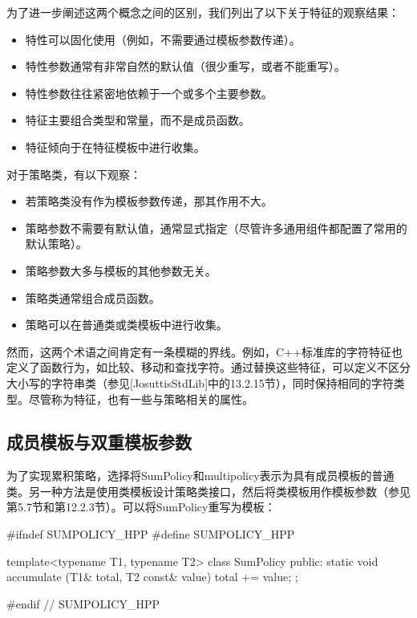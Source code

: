 为了进一步阐述这两个概念之间的区别，我们列出了以下关于特征的观察结果：

\begin{itemize}
\item 
特性可以固化使用（例如，不需要通过模板参数传递）。

\item 
特性参数通常有非常自然的默认值（很少重写，或者不能重写）。

\item 
特性参数往往紧密地依赖于一个或多个主要参数。

\item 
特征主要组合类型和常量，而不是成员函数。

\item 
特征倾向于在特征模板中进行收集。
\end{itemize}

对于策略类，有以下观察：

\begin{itemize}
\item 
若策略类没有作为模板参数传递，那其作用不大。

\item 
策略参数不需要有默认值，通常显式指定（尽管许多通用组件都配置了常用的默认策略）。

\item 
策略参数大多与模板的其他参数无关。

\item 
策略类通常组合成员函数。

\item 
策略可以在普通类或类模板中进行收集。
\end{itemize}

然而，这两个术语之间肯定有一条模糊的界线。例如，C++标准库的字符特征也定义了函数行为，如比较、移动和查找字符。通过替换这些特征，可以定义不区分大小写的字符串类（参见[JosuttisStdLib]中的13.2.15节），同时保持相同的字符类型。尽管称为特征，也有一些与策略相关的属性。

\subsection{成员模板与双重模板参数}

为了实现累积策略，选择将SumPolicy和multipolicy表示为具有成员模板的普通类。另一种方法是使用类模板设计策略类接口，然后将类模板用作模板参数（参见第5.7节和第12.2.3节）。可以将SumPolicy重写为模板：

\begin{cpp}
#ifndef SUMPOLICY_HPP
#define SUMPOLICY_HPP

template<typename T1, typename T2>
class SumPolicy {
	public:
	static void accumulate (T1& total, T2 const& value) {
		total += value;
	}
};

#endif // SUMPOLICY_HPP
\end{cpp}

